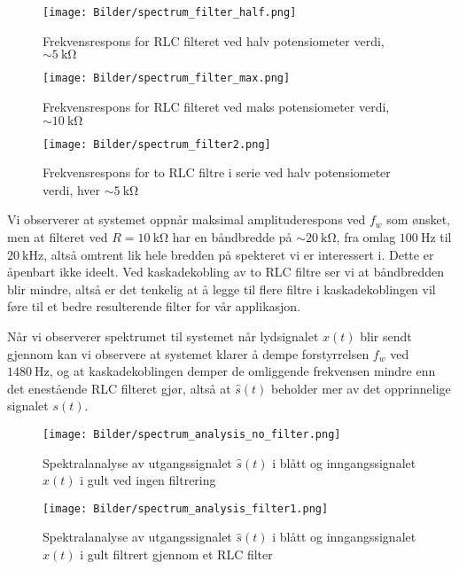 \begin{figure}[H]
    \centering
    \texttt{[image: Bilder/spectrum\_filter\_half.png]}
    \caption{Frekvensrespons for RLC filteret ved halv potensiometer verdi, $\sim \SI{5}{\kilo\ohm}$}
\end{figure}

\begin{figure}[H]
    \centering
    \texttt{[image: Bilder/spectrum\_filter\_max.png]}
    \caption{Frekvensrespons for RLC filteret ved maks potensiometer verdi, $\sim \SI{10}{\kilo\ohm}$}
\end{figure}

\begin{figure}[H]
    \centering
    \texttt{[image: Bilder/spectrum\_filter2.png]}
    \caption{Frekvensrespons for to RLC filtre i serie ved halv potensiometer verdi, hver $\sim \SI{5}{\kilo\ohm}$}
\end{figure}

Vi observerer at systemet oppnår maksimal amplituderespons ved $f_w$ som ønsket, men at filteret ved $R = \SI{10}{\kilo\ohm}$ har en båndbredde 
på $\sim \SI{20}{\kilo\ohm}$, fra omlag $\SI{100}{\hertz}$ til $\SI{20}{\kilo\hertz}$, altså omtrent lik hele bredden på spekteret vi er interessert i.
Dette er åpenbart ikke ideelt. Ved kaskadekobling av to RLC filtre ser vi at båndbredden blir mindre, altså er det tenkelig at å legge til flere 
filtre i kaskadekoblingen vil føre til et bedre resulterende filter for vår applikasjon.

Når vi observerer spektrumet til systemet når lydsignalet $x(t)$ blir sendt gjennom kan vi observere at systemet klarer å dempe forstyrrelsen $f_w$ ved $\SI{1480}{\hertz}$,
og at kaskadekoblingen demper de omliggende frekvensen mindre enn det enestående RLC filteret gjør, altså at $\hat{s}(t)$ beholder mer av det opprinnelige signalet $s(t)$.

\begin{figure}[H]
    \centering
    \texttt{[image: Bilder/spectrum\_analysis\_no\_filter.png]}
    \caption{Spektralanalyse av utgangssignalet $\hat{s}(t)$ i blått og inngangssignalet $x(t)$ i gult ved ingen filtrering}
\end{figure}

\begin{figure}[H]
    \centering
    \texttt{[image: Bilder/spectrum\_analysis\_filter1.png]}
    \caption{Spektralanalyse av utgangssignalet $\hat{s}(t)$ i blått og inngangssignalet $x(t)$ i gult filtrert gjennom et RLC filter}
\end{figure}

